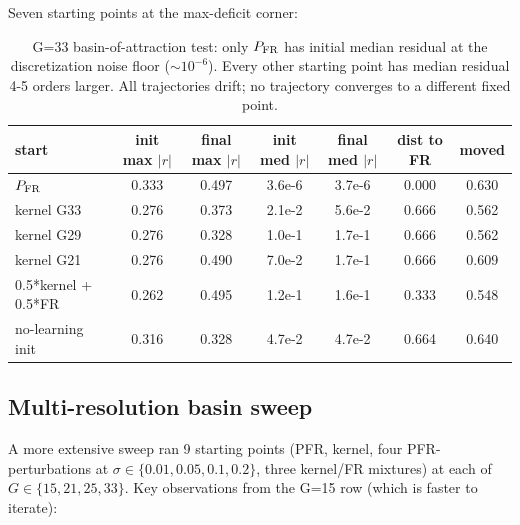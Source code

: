 \documentclass[11pt]{article}
\newcommand{\1}{\mathbf{1}}
\newcommand{\PFR}{P_{\rm FR}}
\begin{document}
Seven starting points at the max-deficit corner:
\begin{table}[H]\centering\small
\begin{tabular}{lcccccc}
\toprule
start & init max $|r|$ & final max $|r|$ & init med $|r|$ & final med $|r|$ & dist to FR & moved\\
\midrule
$\PFR$ & 0.333 & 0.497 & 3.6e-6 & 3.7e-6 & 0.000 & 0.630\\
kernel G33 & 0.276 & 0.373 & 2.1e-2 & 5.6e-2 & 0.666 & 0.562\\
kernel G29 & 0.276 & 0.328 & 1.0e-1 & 1.7e-1 & 0.666 & 0.562\\
kernel G21 & 0.276 & 0.490 & 7.0e-2 & 1.7e-1 & 0.666 & 0.609\\
0.5*kernel + 0.5*FR & 0.262 & 0.495 & 1.2e-1 & 1.6e-1 & 0.333 & 0.548\\
no-learning init & 0.316 & 0.328 & 4.7e-2 & 4.7e-2 & 0.664 & 0.640\\
\bottomrule
\end{tabular}
\caption{G=33 basin-of-attraction test: only $\PFR$ has initial median
residual at the discretization noise floor ($\sim 10^{-6}$).  Every
other starting point has median residual 4-5 orders larger.  All
trajectories drift; no trajectory converges to a different fixed
point.}
\end{table}

\subsection{Multi-resolution basin sweep}

A more extensive sweep ran 9 starting points (PFR, kernel, four
PFR-perturbations at $\sigma \in \{0.01, 0.05, 0.1, 0.2\}$, three
kernel/FR mixtures) at each of $G \in \{15, 21, 25, 33\}$.  Key
observations from the G=15 row (which is faster to iterate):
\end{document}
